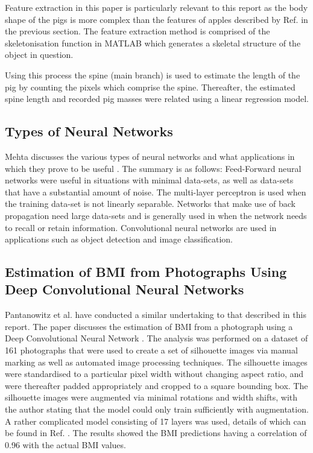 \documentclass[conference]{IEEEtran}
\begin{document}
Feature extraction in this paper is particularly relevant to this report as the body shape of the pigs is more complex than the features of apples described by Ref. \cite{comert} in the previous section. 
The feature extraction method is comprised of the skeletonisation function in MATLAB which generates a skeletal structure of the object in question.

Using this process the spine (main branch) is used to estimate the length of the pig by counting the pixels which comprise the spine.
Thereafter, the estimated spine length and recorded pig masses were related using a linear regression model.

\subsection{Types of Neural Networks}
Mehta discusses the various types of neural networks and what applications in which they prove to be useful \cite{mehta_2019}. 
The summary is as follows:
Feed-Forward neural networks were useful in situations with minimal data-sets, as well as data-sets that have a substantial amount of noise.
The multi-layer perceptron is used when the training data-set is not linearly separable.
Networks that make use of back propagation need large data-sets and is generally used in when the network needs to recall or retain information.
Convolutional neural networks are used in applications such as object detection and image classification.

\subsection{Estimation of BMI from Photographs Using Deep Convolutional Neural Networks}
Pantanowitz et al. have conducted a similar undertaking to that described in this report.
The paper discusses the estimation of BMI from a photograph using a Deep Convolutional Neural Network \cite{bmifromphoto}.
The analysis was performed on a dataset of 161 photographs that were used to create a set of silhouette images via manual marking as well as automated image processing techniques.
The silhouette images were standardised to a particular pixel width without changing aspect ratio, and were thereafter padded appropriately and cropped to a square bounding box.
The silhouette images were augmented via minimal rotations and width shifts, with the author stating that the model could only train sufficiently with augmentation.
A rather complicated model consisting of 17 layers was used, details of which can be found in Ref. \cite{bmifromphoto}.
The results showed the BMI predictions having a correlation of 0.96 with the actual BMI values.
\end{document}
